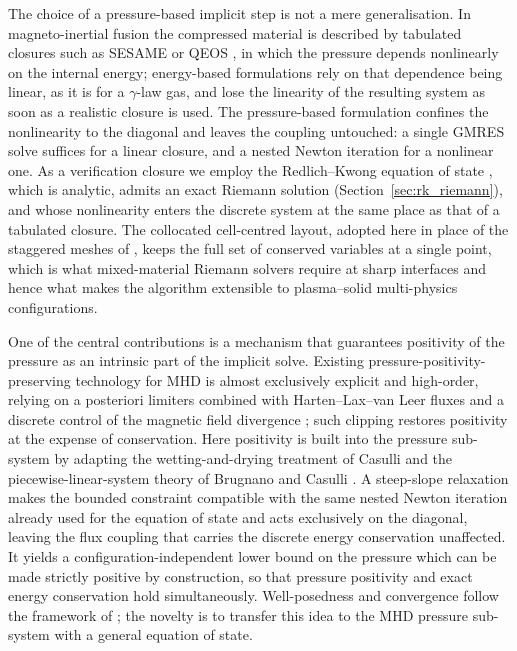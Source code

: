 \documentclass[a4paper,fleqn]{cas-sc}
\theoremstyle{definition}
\theoremstyle{remark}
\begin{document}
The choice of a pressure-based implicit step is not a mere generalisation. In
magneto-inertial fusion the compressed material is described by tabulated closures such
as SESAME \cite{SESAME} or QEOS \cite{QEOS}, in which the pressure depends nonlinearly
on the internal energy; energy-based formulations rely on that dependence being linear,
as it is for a $\gamma$-law gas, and lose the linearity of the resulting system as soon
as a realistic closure is used. The pressure-based formulation confines the
nonlinearity to the diagonal and leaves the coupling untouched: a single
GMRES solve suffices for a linear closure, and a nested Newton iteration for a
nonlinear one. As a verification closure we employ the Redlich--Kwong equation of state
\cite{RedlichKwong1949}, which is analytic, admits an exact Riemann solution
(Section~\ref{sec:rk_riemann}), and whose nonlinearity enters the discrete system at
the same place as that of a tabulated closure. The collocated cell-centred layout,
adopted here in place of the staggered meshes of \cite{Dumbser2019,Fambri2021}, keeps
the full set of conserved variables at a single point, which is what mixed-material
Riemann solvers require at sharp interfaces and hence what makes the algorithm
extensible to plasma--solid multi-physics configurations.

One of the central contributions is a mechanism that guarantees positivity of the pressure as
an intrinsic part of the implicit solve. Existing pressure-positivity-preserving technology for
MHD is almost exclusively explicit and high-order, relying on a posteriori limiters
combined with Harten--Lax--van Leer fluxes and a discrete control of the magnetic field
divergence \cite{Balsara2012,wu2018,ChristliebEtAl2015,DingWu2024,WLSENO_PP2021};
such clipping restores positivity at the expense of conservation. Here positivity is
built into the pressure sub-system by adapting the wetting-and-drying treatment of
Casulli \cite{Casulli2009} and the piecewise-linear-system theory of Brugnano and
Casulli \cite{BrugnanoCasulli2009}. A steep-slope relaxation makes the bounded
constraint compatible with the same nested Newton iteration already used for the
equation of state and acts exclusively on the diagonal, leaving the flux coupling that
carries the discrete energy conservation unaffected. It yields a
configuration-independent lower bound on the pressure which can be made strictly
positive by construction, so that pressure positivity and exact energy conservation hold
simultaneously. Well-posedness and convergence follow the framework of
\cite{Casulli2009,BrugnanoCasulli2009,CasulliZanolli2012}; the novelty is to transfer
this idea to the MHD pressure sub-system with a general equation of state.
\end{document}
